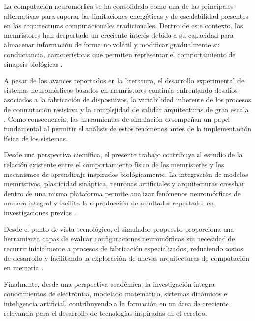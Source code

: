 La computación neuromórfica se ha consolidado como una de las principales alternativas para superar las limitaciones energéticas y de escalabilidad presentes en las arquitecturas computacionales tradicionales. Dentro de este contexto, los memristores han despertado un creciente interés debido a su capacidad para almacenar información de forma no volátil y modificar gradualmente su conductancia, características que permiten representar el comportamiento de sinapsis biológicas \cite{2,26}.

A pesar de los avances reportados en la literatura, el desarrollo experimental de sistemas neuromórficos basados en memristores continúa enfrentando desafíos asociados a la fabricación de dispositivos, la variabilidad inherente de los procesos de conmutación resistiva y la complejidad de validar arquitecturas de gran escala \cite{21,27,29}. Como consecuencia, las herramientas de simulación desempeñan un papel fundamental al permitir el análisis de estos fenómenos antes de la implementación física de los sistemas.

Desde una perspectiva científica, el presente trabajo contribuye al estudio de la relación existente entre el comportamiento físico de los memristores y los mecanismos de aprendizaje inspirados biológicamente. La integración de modelos memristivos, plasticidad sináptica, neuronas artificiales y arquitecturas crossbar dentro de una misma plataforma permite analizar fenómenos neuromórficos de manera integral y facilita la reproducción de resultados reportados en investigaciones previas \cite{3,7}.

Desde el punto de vista tecnológico, el simulador propuesto proporciona una herramienta capaz de evaluar configuraciones neuromórficas sin necesidad de recurrir inicialmente a procesos de fabricación especializados, reduciendo costos de desarrollo y facilitando la exploración de nuevas arquitecturas de computación en memoria \cite{5,11}.

Finalmente, desde una perspectiva académica, la investigación integra conocimientos de electrónica, modelado matemático, sistemas dinámicos e inteligencia artificial, contribuyendo a la formación en un área de creciente relevancia para el desarrollo de tecnologías inspiradas en el cerebro.